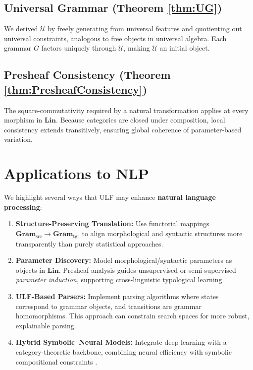 \documentclass[12pt]{article}
\theoremstyle{plain}
\theoremstyle{definition}
\begin{document}
\subsection{Universal Grammar (Theorem \ref{thm:UG})}
We derived \(\mathcal{U}\) by freely generating from universal features and quotienting out universal constraints, analogous to free objects in universal algebra. Each grammar \(G\) factors uniquely through \(\mathcal{U}\), making \(\mathcal{U}\) an initial object.

\subsection{Presheaf Consistency (Theorem \ref{thm:PresheafConsistency})}
The square-commutativity required by a natural transformation applies at every morphism in \(\mathbf{Lin}\). Because categories are closed under composition, local consistency extends transitively, ensuring global coherence of parameter-based variation.

\section{Applications to NLP}\label{sec:nlp}
We highlight several ways that ULF may enhance \textbf{natural language processing}:

\begin{enumerate}
    \item \textbf{Structure-Preserving Translation:}  
    Use functorial mappings \(\mathbf{Gram}_{\mathrm{src}} \to \mathbf{Gram}_{\mathrm{tgt}}\) to align morphological and syntactic structures more transparently than purely statistical approaches.

    \item \textbf{Parameter Discovery:}  
    Model morphological/syntactic parameters as objects in \(\mathbf{Lin}\). Presheaf analysis guides unsupervised or semi-supervised \emph{parameter induction}, supporting cross-linguistic typological learning.

    \item \textbf{ULF-Based Parsers:}  
    Implement parsing algorithms where states correspond to grammar objects, and transitions are grammar homomorphisms. This approach can constrain search spaces for more robust, explainable parsing.

    \item \textbf{Hybrid Symbolic--Neural Models:}  
    Integrate deep learning with a category-theoretic backbone, combining neural efficiency with symbolic compositional constraints \cite{KleinManning}.
\end{enumerate}
\end{document}
